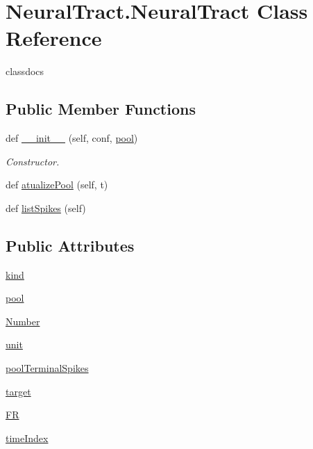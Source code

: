 \hypertarget{class_neural_tract_1_1_neural_tract}{}\section{Neural\+Tract.\+Neural\+Tract Class Reference}
\label{class_neural_tract_1_1_neural_tract}


classdocs  


\subsection*{Public Member Functions}
\begin{DoxyCompactItemize}
\item 
def \hyperlink{class_neural_tract_1_1_neural_tract_a06e60f2f98f39f21c542c108245cb937}{\+\_\+\+\_\+init\+\_\+\+\_\+} (self, conf, \hyperlink{class_neural_tract_1_1_neural_tract_af0d232b9b86f3bae802b32777d0405d0}{pool})
\begin{DoxyCompactList}\small\item\em Constructor. \end{DoxyCompactList}\item 
def \hyperlink{class_neural_tract_1_1_neural_tract_acae726b486d80f6a60c6c2ddabadb5a7}{atualize\+Pool} (self, t)
\item 
def \hyperlink{class_neural_tract_1_1_neural_tract_ad0119f85114d9da23e17c90ef9638da7}{list\+Spikes} (self)
\end{DoxyCompactItemize}
\subsection*{Public Attributes}
\begin{DoxyCompactItemize}
\item 
\hyperlink{class_neural_tract_1_1_neural_tract_af52b112c86e0c774fa204b7e2154b6aa}{kind}
\item 
\hyperlink{class_neural_tract_1_1_neural_tract_af0d232b9b86f3bae802b32777d0405d0}{pool}
\item 
\hyperlink{class_neural_tract_1_1_neural_tract_a9cf4c6df3fb8818e955817bb3ea9ffc4}{Number}
\item 
\hyperlink{class_neural_tract_1_1_neural_tract_a95db7d0720ec12f091758968476ba240}{unit}
\item 
\hyperlink{class_neural_tract_1_1_neural_tract_a1d104906ff30028e44e377a9e1ed5a3d}{pool\+Terminal\+Spikes}
\item 
\hyperlink{class_neural_tract_1_1_neural_tract_a637995fcac5bdd80ab1a9d4ea3de7f40}{target}
\item 
\hyperlink{class_neural_tract_1_1_neural_tract_aefbec14cba88a937841314d47f6056c0}{FR}
\item 
\hyperlink{class_neural_tract_1_1_neural_tract_adcda2b95aa86d4e7eebcc2557aee58cf}{time\+Index}
\end{DoxyCompactItemize}


